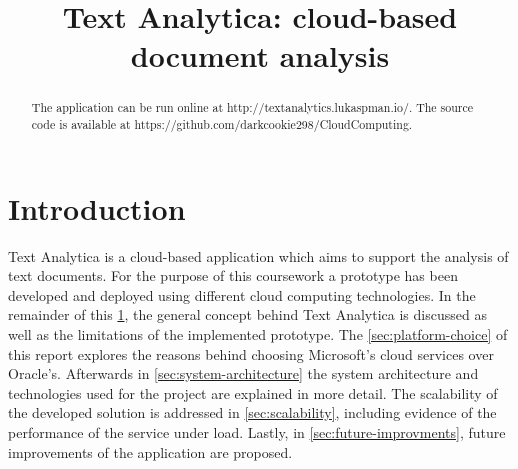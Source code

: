 \documentclass[conference]{IEEEtran}
\begin{document}
\title{Text Analytica: cloud-based document analysis\\}

\author{
\and
{}
}

\maketitle

\begin{abstract}
The application can be run online at http://textanalytics.lukaspman.io/.
The source code is available at https://github.com/darkcookie298/CloudComputing.
\end{abstract}

\section{Introduction}
\label{sec:intro}
Text Analytica is a cloud-based application which aims to support the analysis of text documents. For the purpose of this coursework a prototype has been developed and deployed using different cloud computing technologies. In the remainder of this \cref{sec:intro}, the general concept behind Text Analytica is discussed as well as the limitations of the implemented prototype. The \cref{sec:platform-choice} of this report explores the reasons behind choosing Microsoft’s cloud services over Oracle’s. Afterwards in \cref{sec:system-architecture} the system architecture and technologies used for the project are explained in more detail. The scalability of the developed solution is addressed in \cref{sec:scalability}, including evidence of the performance of the service under load. Lastly, in \cref{sec:future-improvments}, future improvements of the application are proposed.
\end{document}
